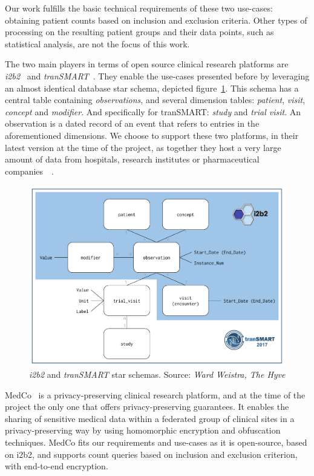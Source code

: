 Our work fulfills the basic technical requirements of these two use-cases: obtaining patient counts based on inclusion and exclusion criteria.
Other types of processing on the resulting patient groups and their data points, such as statistical analysis, are not the focus of this work.

The two main players in terms of open source clinical research platforms are \emph{i2b2}~\cite{murphy2010serving} and \emph{tranSMART}~\cite{scheufele2014transmart}.
They enable the use-cases presented before by leveraging an almost identical database star schema, depicted figure~\ref{fig:star-schema}.
This schema has a central table containing \emph{observations}, and several dimension tables: \emph{patient}, \emph{visit}, \emph{concept} and \emph{modifier}.
And specifically for tranSMART: \emph{study} and \emph{trial visit}.
An observation is a dated record of an event that refers to entries in the aforementioned dimensions.
We choose to support these two platforms, in their latest version at the time of the project, as together they host a very large amount of data from hospitals, research institutes or pharmaceutical companies~\cite{i2b2community}~\cite{transmartcommunity}.

\begin{figure}[ht]
    \centering
    \includegraphics[width=1\textwidth]{figures/star_schema.pdf}
    \caption{\emph{i2b2} and \emph{tranSMART} star schemas. Source: \emph{Ward Weistra, The Hyve}}
    \label{fig:star-schema}
\end{figure}

MedCo~\cite{medco} is a privacy-preserving clinical research platform, and at the time of the project the only one that offers privacy-preserving guarantees.
It enables the sharing of sensitive medical data within a federated group of clinical sites in a privacy-preserving way by using homomorphic encryption and obfuscation techniques.
MedCo fits our requirements and use-cases as it is open-source, based on i2b2, and supports count queries based on inclusion and exclusion criterion, with end-to-end encryption.


